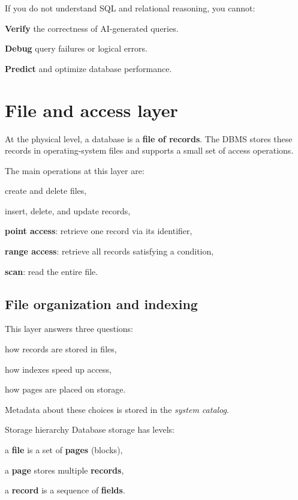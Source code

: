 \documentclass[../../dis.tex]{subfiles}
\begin{document}
If you do not understand SQL and relational reasoning, you cannot:
\begin{dashlist}
    \item \textbf{Verify} the correctness of AI-generated queries.
    \item \textbf{Debug} query failures or logical errors.
    \item \textbf{Predict} and optimize database performance.
\end{dashlist}
\newpage
\section{File and access layer}
At the physical level, a database is a \textbf{file of records}. The DBMS stores these records in operating-system files and supports a small set of access operations.

The main operations at this layer are:
\begin{dashlist}
    \item create and delete files,
    \item insert, delete, and update records,
    \item \textbf{point access}: retrieve one record via its identifier,
    \item \textbf{range access}: retrieve all records satisfying a condition,
    \item \textbf{scan}: read the entire file.
\end{dashlist}

\subsection{File organization and indexing}
This layer answers three questions:
\begin{dashlist}
    \item how records are stored in files,
    \item how indexes speed up access,
    \item how pages are placed on storage.
\end{dashlist}

Metadata about these choices is stored in the \emph{system catalog}.

\begin{concept}{Storage hierarchy}
Database storage has levels:
\begin{dashlist}
    \item a \textbf{file} is a set of \textbf{pages} (blocks),
    \item a \textbf{page} stores multiple \textbf{records},
    \item a \textbf{record} is a sequence of \textbf{fields}.
\end{dashlist}
\end{concept}
\end{document}
